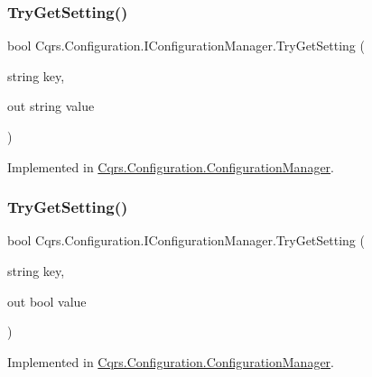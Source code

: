 \subsubsection{\texorpdfstring{Try\+Get\+Setting()}{TryGetSetting()}\hspace{0.1cm}{\footnotesize\ttfamily [1/2]}}
{\footnotesize\ttfamily bool Cqrs.\+Configuration.\+I\+Configuration\+Manager.\+Try\+Get\+Setting (\begin{DoxyParamCaption}\item[{string}]{key,  }\item[{out string}]{value }\end{DoxyParamCaption})}



Implemented in \hyperlink{classCqrs_1_1Configuration_1_1ConfigurationManager_ad87af2a011af065d6d3e0d2ff01c7f6e_ad87af2a011af065d6d3e0d2ff01c7f6e}{Cqrs.\+Configuration.\+Configuration\+Manager}.

\mbox{\label{interfaceCqrs_1_1Configuration_1_1IConfigurationManager_a8389181330999fcb8e30af4dbb56d35e_a8389181330999fcb8e30af4dbb56d35e}} 
\subsubsection{\texorpdfstring{Try\+Get\+Setting()}{TryGetSetting()}\hspace{0.1cm}{\footnotesize\ttfamily [2/2]}}
{\footnotesize\ttfamily bool Cqrs.\+Configuration.\+I\+Configuration\+Manager.\+Try\+Get\+Setting (\begin{DoxyParamCaption}\item[{string}]{key,  }\item[{out bool}]{value }\end{DoxyParamCaption})}



Implemented in \hyperlink{classCqrs_1_1Configuration_1_1ConfigurationManager_a40810d0b9fd2f3d1c4a270681e908c84_a40810d0b9fd2f3d1c4a270681e908c84}{Cqrs.\+Configuration.\+Configuration\+Manager}.

